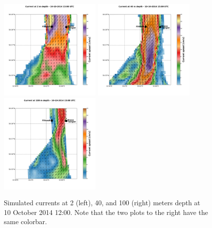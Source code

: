 \begin{figure}[ht]
	\centerline{
		\includegraphics*[trim=2cm 3cm 1cm 3.3cm,clip=true,height=5cm]{Figurer/Filtvedt_t4611_z2_current}
		\includegraphics*[trim=3.8cm 3cm 6cm 3.3cm,clip=true,height=5cm]{Figurer/Filtvedt_t4611_z40_current}
		\includegraphics*[trim=3.8cm 3cm 1cm 3.3cm,clip=true,height=5cm]{Figurer/Filtvedt_t4611_z100_current}}
	\caption{\small Simulated currents at 2 (left), 40, and 100 (right) meters depth at 10 October 2014 12:00. Note that the two plots to the right have the same colorbar.}
	\label{fig:Filtvedt-simcur}
\end{figure}

